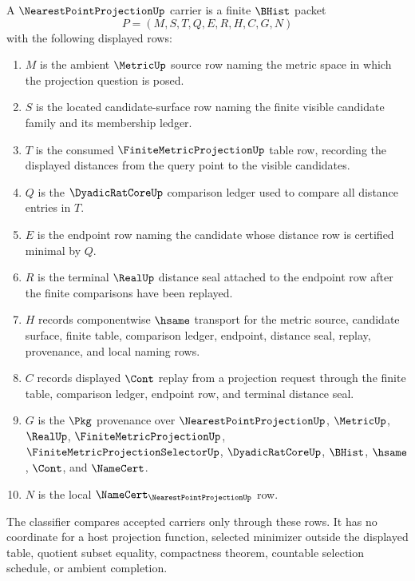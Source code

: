 \begin{definition}
\label{def:nearest-point-projection-carrier}
A $\NearestPointProjectionUp$ carrier is a finite $\BHist$ packet
$$
P=(M,S,T,Q,E,R,H,C,G,N)
$$
with the following displayed rows:
\begin{enumerate}
\item $M$ is the ambient $\MetricUp$ source row naming the metric space in which the projection question is posed.
\item $S$ is the located candidate-surface row naming the finite visible candidate family and its membership ledger.
\item $T$ is the consumed $\FiniteMetricProjectionUp$ table row, recording the displayed distances from the query point to the visible candidates.
\item $Q$ is the $\DyadicRatCoreUp$ comparison ledger used to compare all distance entries in $T$.
\item $E$ is the endpoint row naming the candidate whose distance row is certified minimal by $Q$.
\item $R$ is the terminal $\RealUp$ distance seal attached to the endpoint row after the finite comparisons have been replayed.
\item $H$ records componentwise $\hsame$ transport for the metric source, candidate surface, finite table, comparison ledger, endpoint, distance seal, replay, provenance, and local naming rows.
\item $C$ records displayed $\Cont$ replay from a projection request through the finite table, comparison ledger, endpoint row, and terminal distance seal.
\item $G$ is the $\Pkg$ provenance over $\NearestPointProjectionUp$, $\MetricUp$, $\RealUp$, $\FiniteMetricProjectionUp$, $\FiniteMetricProjectionSelectorUp$, $\DyadicRatCoreUp$, $\BHist$, $\hsame$, $\Cont$, and $\NameCert$.
\item $N$ is the local $\NameCert_{\NearestPointProjectionUp}$ row.
\end{enumerate}
The classifier compares accepted carriers only through these rows. It has no coordinate for a host projection function, selected minimizer outside the displayed table, quotient subset equality, compactness theorem, countable selection schedule, or ambient completion.
\end{definition}

